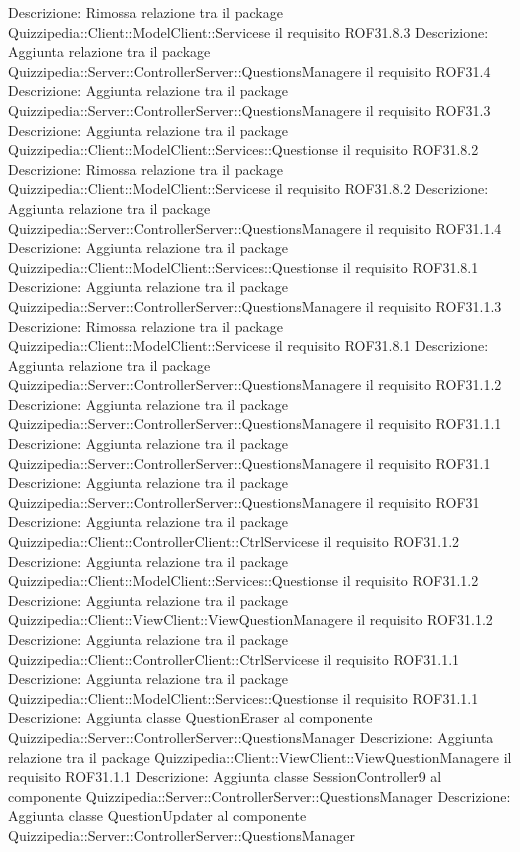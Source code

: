Descrizione: Rimossa relazione tra il package Quizzipedia::Client::ModelClient::Servicese il requisito ROF31.8.3 
Descrizione: Aggiunta relazione tra il package Quizzipedia::Server::ControllerServer::QuestionsManagere il requisito ROF31.4 
Descrizione: Aggiunta relazione tra il package Quizzipedia::Server::ControllerServer::QuestionsManagere il requisito ROF31.3 
Descrizione: Aggiunta relazione tra il package Quizzipedia::Client::ModelClient::Services::Questionse il requisito ROF31.8.2 
Descrizione: Rimossa relazione tra il package Quizzipedia::Client::ModelClient::Servicese il requisito ROF31.8.2 
Descrizione: Aggiunta relazione tra il package Quizzipedia::Server::ControllerServer::QuestionsManagere il requisito ROF31.1.4 
Descrizione: Aggiunta relazione tra il package Quizzipedia::Client::ModelClient::Services::Questionse il requisito ROF31.8.1 
Descrizione: Aggiunta relazione tra il package Quizzipedia::Server::ControllerServer::QuestionsManagere il requisito ROF31.1.3 
Descrizione: Rimossa relazione tra il package Quizzipedia::Client::ModelClient::Servicese il requisito ROF31.8.1 
Descrizione: Aggiunta relazione tra il package Quizzipedia::Server::ControllerServer::QuestionsManagere il requisito ROF31.1.2 
Descrizione: Aggiunta relazione tra il package Quizzipedia::Server::ControllerServer::QuestionsManagere il requisito ROF31.1.1 
Descrizione: Aggiunta relazione tra il package Quizzipedia::Server::ControllerServer::QuestionsManagere il requisito ROF31.1 
Descrizione: Aggiunta relazione tra il package Quizzipedia::Server::ControllerServer::QuestionsManagere il requisito ROF31 
Descrizione: Aggiunta relazione tra il package Quizzipedia::Client::ControllerClient::CtrlServicese il requisito ROF31.1.2 
Descrizione: Aggiunta relazione tra il package Quizzipedia::Client::ModelClient::Services::Questionse il requisito ROF31.1.2 
Descrizione: Aggiunta relazione tra il package Quizzipedia::Client::ViewClient::ViewQuestionManagere il requisito ROF31.1.2 
Descrizione: Aggiunta relazione tra il package Quizzipedia::Client::ControllerClient::CtrlServicese il requisito ROF31.1.1 
Descrizione: Aggiunta relazione tra il package Quizzipedia::Client::ModelClient::Services::Questionse il requisito ROF31.1.1 
Descrizione: Aggiunta classe QuestionEraser al componente Quizzipedia::Server::ControllerServer::QuestionsManager 
Descrizione: Aggiunta relazione tra il package Quizzipedia::Client::ViewClient::ViewQuestionManagere il requisito ROF31.1.1 
Descrizione: Aggiunta classe SessionController9 al componente Quizzipedia::Server::ControllerServer::QuestionsManager 
Descrizione: Aggiunta classe QuestionUpdater al componente Quizzipedia::Server::ControllerServer::QuestionsManager 
